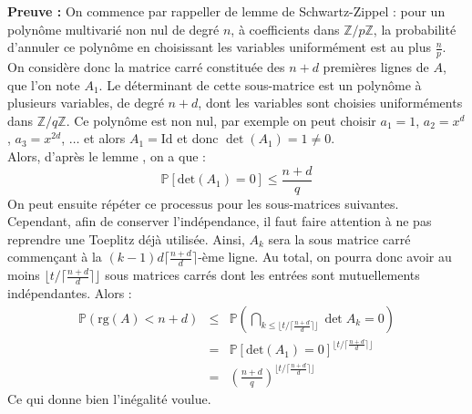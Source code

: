 \documentclass[11pt,a4paper]{article}
\begin{document}
\textbf{Preuve :}
On commence par rappeller de lemme de Schwartz-Zippel : pour un polynôme multivarié non nul de degré $n$, à coefficients dans $\mathbb{Z}/p\mathbb{Z}$, la probabilité d'annuler ce polynôme en choisissant les variables uniformément est au plus $\frac{n}{p}$. \\
On considère donc la matrice carré constituée des $n+d$ premières lignes de $A$, que l'on note $A_1$. Le déterminant de cette sous-matrice est un polynôme à plusieurs variables, de degré $n+d$, dont les variables sont choisies uniforméments dans $\mathbb{Z}/q\mathbb{Z}$. Ce polynôme est non nul, par exemple on peut choisir $a_1=1$, $a_2= x^d$, $a_3=x^{2d}$, $\dots$ et alors $A_1 = \text{Id}$ et donc $\det(A_1)=1\neq 0$.
\\ Alors, d'après le lemme , on a que : \[\mathbb{P}[\text{det}(A_1)=0] \leq \frac{n+d}{q}\]
On peut ensuite répéter ce processus pour les sous-matrices suivantes. Cependant, afin de conserver l'indépendance, il faut faire attention à ne pas reprendre une Toeplitz déjà utilisée. Ainsi, $A_k$ sera la sous matrice carré commençant à la $ (k-1)d\lceil \frac{n+d}{d} \rceil $-ème ligne. Au total, on pourra donc avoir au moins $\lfloor t/\lceil\frac{n+d}{d}\rceil\rfloor$ sous matrices carrés dont les entrées sont mutuellements indépendantes. Alors : 
\begin{eqnarray*}
\mathbb{P}(\text{rg}(A)<n+d) &\leq& \mathbb{P}(\bigcap_{k\leq\lfloor t/\lceil\frac{n+d}{d}\rceil\rfloor} \det{A_k} = 0) \\
&=&\mathbb{P}[\text{det}(A_1)=0]^{\lfloor t/\lceil\frac{n+d}{d}\rceil\rfloor} \\
&=&  (\frac{n+d}{q})^{\lfloor t/\lceil\frac{n+d}{d}\rceil\rfloor}
\end{eqnarray*}
Ce qui donne bien l'inégalité voulue.
\end{document}
